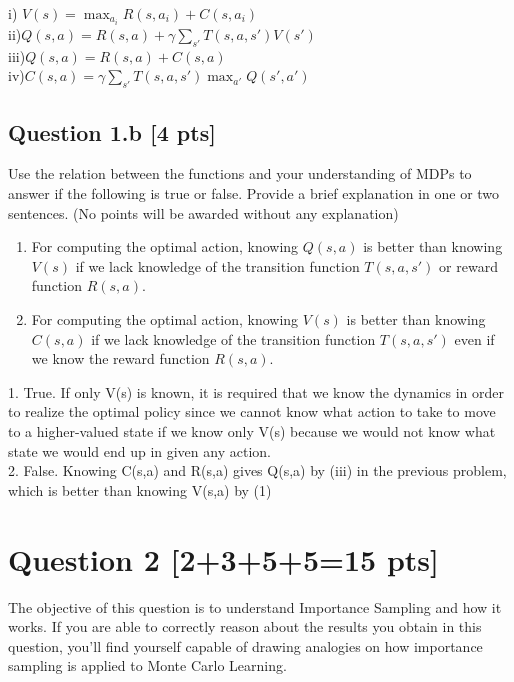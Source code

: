 \documentclass[12pt]{article}
\begin{document}
\begin{solution}
i) $V(s) = \max_{a_{i}} R(s,a_{i}) + C(s,a_{i})$\\
ii)$Q(s,a) = R(s,a) + \gamma \sum_{s'} T(s,a,s')V(s')$ \\
iii)$Q(s,a) = R(s,a)  + C(s,a)$\\
iv)$C(s,a) = \gamma \sum_{s'} T(s,a,s')\max_{a'}Q(s',a')$
\end{solution}

\subsection*{Question 1.b \textbf{[4 pts]}}
Use the relation between the functions and your understanding of MDPs to answer if the following is true or false. Provide a brief explanation in one or two sentences. (No points will be awarded without any explanation)
\begin{enumerate}
    \item For computing the optimal action, knowing $Q(s,a)$ is better than knowing $V(s)$ if we lack knowledge of the transition function $T(s,a,s')$ or reward function $R(s,a)$.
    \item For computing the optimal action, knowing $V(s)$ is better than knowing $C(s,a)$ if we lack knowledge of the transition function $T(s,a,s')$ even if we know the reward function $R(s,a)$. 
\end{enumerate}

\begin{solution}
1. True.  If only V(s) is known, it is required that we know the dynamics in order to realize the optimal policy since we cannot know what action to take to move to a higher-valued state if we know only V(s) because we would not know what state we would end up in given any action.\\
2. False.  Knowing C(s,a) and R(s,a) gives Q(s,a) by (iii) in the previous problem, which is better than knowing V(s,a) by (1)
\end{solution}

\section*{Question 2 \textbf{[2+3+5+5=15 pts]}}
The objective of this question is to understand Importance Sampling and how it works. If you are able to correctly reason about the results you obtain in this question, you'll find yourself capable of drawing analogies on how importance sampling is applied to Monte Carlo Learning. \\
\end{document}
